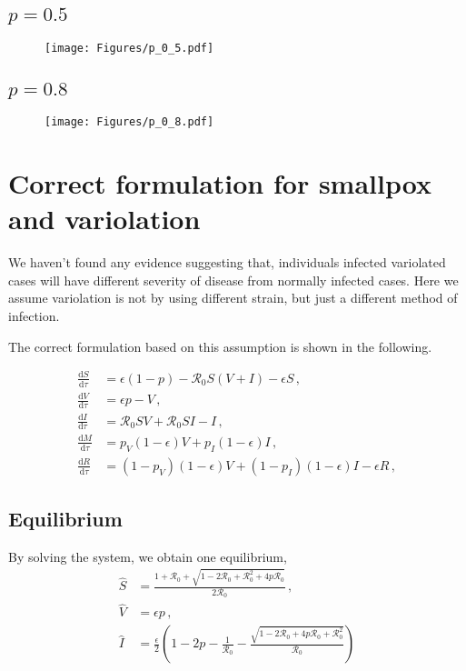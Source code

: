 \documentclass[12pt]{article}
\newcommand\dbyd[2]{\frac{\mathrm d{#1}}{\mathrm d{#2}}}
\newcommand{\R}{\mathcal{R}}
\newcommand{\pmV}{p_{V}}
\newcommand{\pmI}{p_{I}}
\begin{document}
\subsection{$p=0.5$}
\begin{figure}[H]
  \centering
  \texttt{[image: Figures/p\_0\_5.pdf]}
\end{figure}

\subsection{$p=0.8$}
\begin{figure}[H]
  \centering
  \texttt{[image: Figures/p\_0\_8.pdf]}
\end{figure}
\clearpage
\section{Correct formulation for smallpox and variolation}

We haven't found any evidence suggesting that, individuals infected variolated cases will have different severity of disease from normally infected cases. Here we assume variolation is not by using different strain, but just a different method of infection.

The correct formulation based on this assumption is shown in the following.

\begin{subequations}\label{eq:base_ODE}
\begin{align}
\dbyd{S}{\tau}&=\epsilon(1-p)- \R_0 S(V+I)-\epsilon S\,, \label{eq:S_by_tau}\\
\dbyd{V}{\tau}&=\epsilon p-V\,, \label{eq:V_by_tau}\\
\dbyd{I}{\tau}&=\R_0 SV+\R_0 SI-I\,, \label{eq:I_by_tau}\\
\dbyd{M}{\tau}&=\pmV(1-\epsilon) V+\pmI(1-\epsilon) I\,,\\
\dbyd{R}{\tau}&=(1-\pmV)(1-\epsilon) V+(1-\pmI)(1-\epsilon) I-\epsilon R\,,
\end{align}
\end{subequations}

\subsection{Equilibrium}

By solving the system, we obtain one equilibrium,
\begin{subequations}
\begin{align}
\hat{S}&=\frac{1+\R_0+\sqrt{1-2\R_0+\R_0^2+4p\R_0}}{2\R_0}\,,\\
\hat{V}&=\epsilon p\,,\\
\hat{I}&=\frac{\epsilon}{2}(1-2p-\frac{1}{\R_0}-\frac{\sqrt{1-2\R_0+4p\R_0+\R_0^2}}{\R_0})
\end{align}
\end{subequations}
\end{document}
